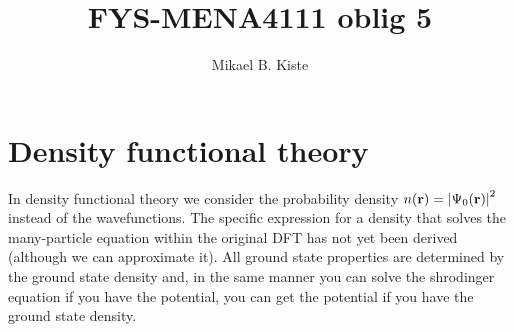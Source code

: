\documentclass{article}
\author{Mikael B. Kiste}
\title{FYS-MENA4111 oblig 5}
\begin{document}
	\maketitle
	\tableofcontents
	\newpage
	
	\section{Density functional theory}
	In density functional theory we consider the probability density $n(\vb{r})=\abs{\Psi_0(\vb{r})}^2$ instead of the wavefunctions. The specific expression for a density that solves the many-particle equation within the original DFT has not yet been derived (although we can approximate it). All ground state properties are determined by the ground state density and, in the same manner you can solve the shrodinger equation if you have the potential, you can get the potential if you have the ground state density.
		
\end{document}
